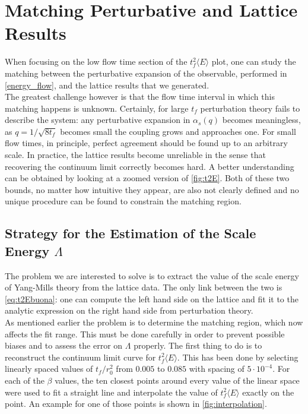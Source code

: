 \section{Matching Perturbative and Lattice Results}
When focusing on the low flow time section of the $t_f^2\langle E \rangle$ plot, one can study the matching between the perturbative expansion of the observable, performed in \cref{energy_flow}, and the lattice results that we generated. \\
The greatest challenge however is that the flow time interval in which this matching happens is unknown. Certainly, for large $t_f$ perturbation theory fails to describe the system: any perturbative expansion in $\alpha_s(q)$ becomes meaningless, as $q=1/\sqrt{8t_f}$ becomes small the coupling grows and approaches one. For small flow times, in principle, perfect agreement should be found up to an arbitrary scale. In practice, the lattice results become unreliable in the sense that recovering the continuum limit correctly becomes hard. A better understanding can be obtained by looking at a zoomed version of \cref{fig:t2E}. Both of these two bounds, no matter how intuitive they appear, are also not clearly defined and no unique procedure can be found to constrain the matching region.

\subsection{Strategy for the Estimation of the Scale Energy $\Lambda$}
The problem we are interested to solve is to extract the value of the scale energy of Yang-Mills theory from the lattice data. The only link between the two is \cref{eq:t2Ebuona}: one can compute the left hand side on the lattice and fit it to the analytic expression on the right hand side from perturbation theory. \\
As mentioned earlier the problem is to determine the matching region, which now affects the fit range. This must be done carefully in order to prevent possible biases and to assess the error on $\Lambda$ properly. The first thing to do is to reconstruct the continuum limit curve for $t_f^2\langle E \rangle$. This has been done by selecting linearly spaced values of $t_f/r_0^2$ from $0.005$ to $0.085$ with spacing of $5\cdot 10^{-4}$. For each of the $\beta$ values, the ten closest points around every value of the linear space were used to fit a straight line and interpolate the value of  $t_f^2\langle E \rangle$ exactly on the point. An example for one of those points is shown in \cref{fig:interpolation}.\\

